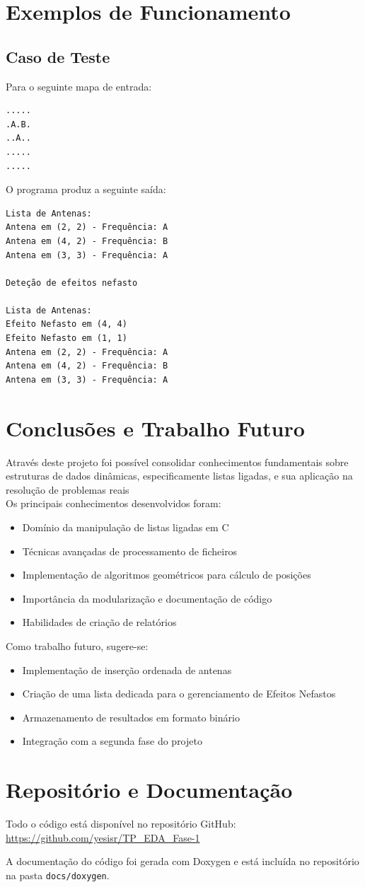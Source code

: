 \documentclass[a4paper,12pt]{article}
\begin{document}
\section{Exemplos de Funcionamento}
\label{sec:resultados}

\subsection{Caso de Teste}
Para o seguinte mapa de entrada:
\begin{verbatim}
.....
.A.B.
..A..
.....
.....
\end{verbatim}

O programa produz a seguinte saída:

\begin{verbatim}
Lista de Antenas:
Antena em (2, 2) - Frequência: A
Antena em (4, 2) - Frequência: B
Antena em (3, 3) - Frequência: A

Deteção de efeitos nefasto 

Lista de Antenas:
Efeito Nefasto em (4, 4)
Efeito Nefasto em (1, 1)
Antena em (2, 2) - Frequência: A
Antena em (4, 2) - Frequência: B
Antena em (3, 3) - Frequência: A
\end{verbatim}

\newpage


\section{Conclusões e Trabalho Futuro}
\label{sec:conclusao}

Através deste projeto foi possível consolidar conhecimentos fundamentais sobre estruturas de dados dinâmicas, especificamente listas ligadas, e sua aplicação na resolução de problemas reais\\

Os principais conhecimentos desenvolvidos foram:
\begin{itemize}
    \item Domínio da manipulação de listas ligadas em C
    \item Técnicas avançadas de processamento de ficheiros
    \item Implementação de algoritmos geométricos para cálculo de posições
    \item Importância da modularização e documentação de código
    \item Habilidades de criação de relatórios
\end{itemize}

Como trabalho futuro, sugere-se:
\begin{itemize}
    \item Implementação de inserção ordenada de antenas
    \item Criação de uma lista dedicada para o gerenciamento de Efeitos Nefastos
    \item Armazenamento de resultados em formato binário
    \item Integração com a segunda fase do projeto
\end{itemize}

\newpage

\section{Repositório e Documentação}
Todo o código está disponível no repositório GitHub: \url{https://github.com/yesisr/TP_EDA_Fase-1}

A documentação do código foi gerada com Doxygen e está incluída no repositório na pasta \texttt{docs/doxygen}.
\end{document}
